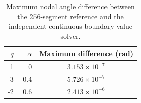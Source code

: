 \begin{table}[htbp]
\centering\small
\caption{Maximum nodal angle difference between the 256-segment reference and the independent continuous boundary-value solver.}\label{tab:bvp}
\begin{tabular}{rrc}\toprule
$q$ & $\alpha$ & Maximum difference (rad)\\\midrule
1 & 0 & $3.153\times 10^{-7}$\\
3 & -0.4 & $5.726\times 10^{-7}$\\
-2 & 0.6 & $2.413\times 10^{-6}$\\
\bottomrule\end{tabular}
\end{table}
